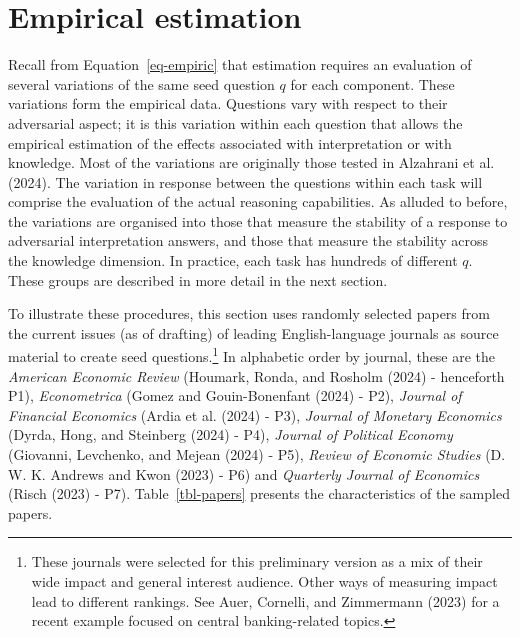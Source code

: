 \documentclass[
]{article}
\theoremstyle{plain}
\theoremstyle{definition}
\theoremstyle{remark}
\begin{document}
\section{Empirical estimation}\label{sec-variation}

Recall from Equation~\ref{eq-empiric} that estimation requires an
evaluation of several variations of the same seed question \(q\) for
each component. These variations form the empirical data. Questions vary
with respect to their adversarial aspect; it is this variation within
each question that allows the empirical estimation of the effects
associated with interpretation or with knowledge. Most of the variations
are originally those tested in Alzahrani et al. (2024). The variation in
response between the questions within each task will comprise the
evaluation of the actual reasoning capabilities. As alluded to before,
the variations are organised into those that measure the stability of a
response to adversarial interpretation answers, and those that measure
the stability across the knowledge dimension. In practice, each task has
hundreds of different \(q\). These groups are described in more detail
in the next section.

To illustrate these procedures, this section uses randomly selected
papers from the current issues (as of drafting) of leading
English-language journals as source material to create seed
questions.\footnote{These journals were selected for this preliminary
  version as a mix of their wide impact and general interest audience.
  Other ways of measuring impact lead to different rankings. See Auer,
  Cornelli, and Zimmermann (2023) for a recent example focused on
  central banking-related topics.} In alphabetic order by journal, these
are the \emph{American Economic Review} (Houmark, Ronda, and Rosholm
(2024) - henceforth P1), \emph{Econometrica} (Gomez and Gouin-Bonenfant
(2024) - P2), \emph{Journal of Financial Economics} (Ardia et al. (2024)
- P3), \emph{Journal of Monetary Economics} (Dyrda, Hong, and Steinberg
(2024) - P4), \emph{Journal of Political Economy} (Giovanni, Levchenko,
and Mejean (2024) - P5), \emph{Review of Economic Studies} (D. W. K.
Andrews and Kwon (2023) - P6) and \emph{Quarterly Journal of Economics}
(Risch (2023) - P7). Table~\ref{tbl-papers} presents the characteristics
of the sampled papers.
\end{document}
